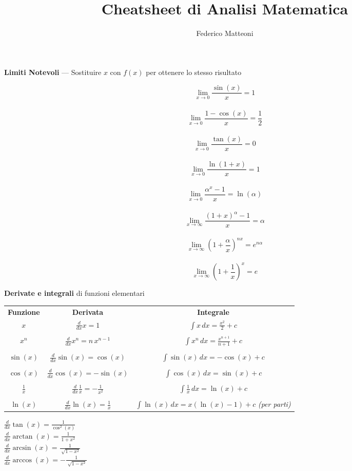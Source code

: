 \documentclass[10pt]{article}
\begin{document}
\title{Cheatsheet di Analisi Matematica}
\author{Federico Matteoni}
\date{ }
\renewcommand*\contentsname{Indice}

\maketitle
\textbf{Limiti Notevoli} --- Sostituire $x$ con $f(x)$ per ottenere lo stesso risultato
\begin{multicols}{4}
$$\lim_{x\to0} \frac{\sin(x)}{x} = 1$$\\
$$\lim_{x\to0} \frac{1 - \cos(x)}{x} = \frac{1}{2}$$\\
$$\lim_{x\to0} \frac{\tan(x)}{x} = 0$$\\
$$\lim_{x\to0} \frac{\ln(1 + x)}{x} = 1$$\\
$$\lim_{x\to0} \frac{\alpha^x - 1}{x} = \ln(\alpha)$$\\
$$\lim_{x\to\infty} \frac{(1 + x)^\alpha - 1}{x} = \alpha$$\\
$$\lim_{x\to\infty} (1 + \frac{\alpha}{x})^{nx} = e^{n\alpha}$$\\
$$\lim_{x\to\infty} (1 + \frac{1}{x})^{x} = e$$
\end{multicols}
\textbf{Derivate e integrali} di funzioni elementari
\begin{center}
	\begin{tabular}{c | c c}
		\textbf{Funzione} & \textbf{Derivata} & \textbf{Integrale} \\
		$x$ & $\frac{d}{dx} x = 1$ & $\int x\,dx = \frac{x^2}{2} + c$ \\
		\\
		$x^n$ & $\frac{d}{dx} x^n = n\,x^{n-1}$ & $\int x^n\,dx = \frac{x^{n+1}}{n+1} + c$ \\
		\\
		$\sin(x)$ & $\frac{d}{dx} \sin(x) = \cos(x)$ & $\int \sin(x)\,dx = -\cos(x) + c$ \\
		\\
		$\cos(x)$ & $\frac{d}{dx} \cos(x) = -\sin(x)$ & $\int \cos(x)\,dx = \sin(x) + c$ \\
		\\
		$\frac{1}{x}$ & $\frac{d}{dx} \frac{1}{x} = -\frac{1}{x^2}$ & $\int \frac{1}{x}\,dx = \ln(x) + c$ \\
		\\
		$\ln(x)$ & $\frac{d}{dx} \ln(x) = \frac{1}{x}$ & $\int \ln(x)\,dx = x(\ln(x) - 1) + c$ \textit{(per parti)} \\
	\end{tabular}
	\begin{multicols}{4}
		$\frac{d}{dx} \tan(x) = \frac{1}{\cos^2(x)}$ \\
		$\frac{d}{dx} \arctan(x) = \frac{1}{1 + x^2}$ \\
		$\frac{d}{dx} \arcsin(x) = \frac{1}{\sqrt[]{1 - x^2}}$\\
		$\frac{d}{dx} \arccos(x) = -\frac{1}{\sqrt[]{1 - x^2}}$\\
	\end{multicols}
\end{center}
\end{document}
